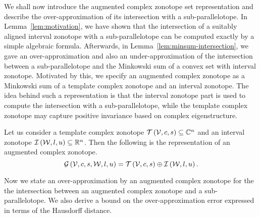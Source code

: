 We shall now introduce the augmented complex zonotope set
representation and describe the over-approximation of its intersection
with a sub-parallelotope.  In Lemma~\ref{lem:motivation}, we have shown that the
intersection of a suitably aligned interval zonotope with a
sub-parallelotope can be computed exactly by a simple algebraic
formula.  Afterwards, in Lemma~\ref{lem:minsum-intersection}, we gave
an over-approximation and also an under-approximation of the intersection
between a sub-parallelotope and the Minkowski sum of a convex set with
interval zonotope.  Motivated by this, we specify an augmented complex zonotope
as a Minkowski sum of a template complex zonotope and an interval
zonotope.  The idea behind such a representation is that the interval
zonotope part is used to compute the intersection with a
sub-parallelotope, while the template complex zonotope may capture
positive invariance based on complex eigenstructure.
%
\begin{definition}
Let us consider a template complex zonotope
$\mathit{\operatorname{\mathcal{T}}}\left(\mathcal{V},c,s\right)\subseteq\mathbb{C}^n$ and an interval
zonotope $\mathit{\operatorname{\mathcal{I}}}\left(\mathcal{W},l,u\right)\subseteq\mathbb{R}^n$.  Then the
following is the representation of an augmented complex zonotope.
%
\[
\mathcal{G}\left(\mathcal{V},c,s,\mathcal{W},l,u\right)=\mathit{\operatorname{\mathcal{T}}}\left(\mathcal{V},c,s\right)\oplus \mathit{\operatorname{\mathcal{I}}}\left(\mathcal{W},l,u\right).
\]
%
\end{definition}
%
Now we state an over-approximation by
an augmented complex zonotope for the
the intersection between an augmented complex zonotope and a
sub-parallelotope.  We also derive a bound on the over-approximation
error expressed in terms of the Hausdorff distance.

